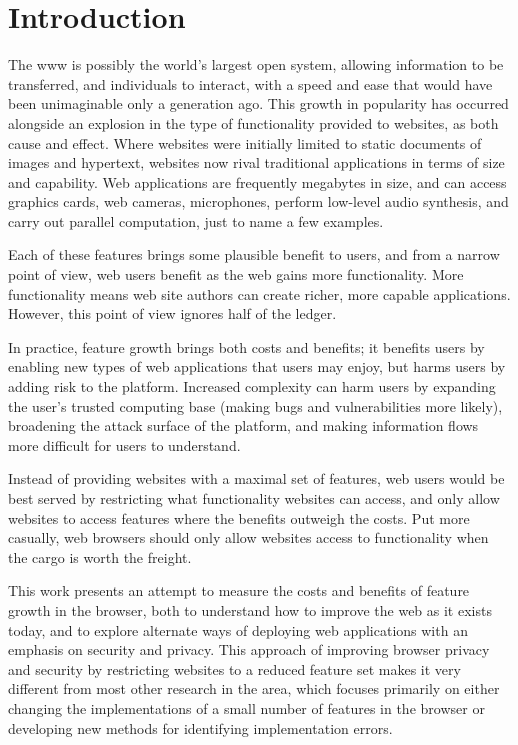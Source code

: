 \chapter{Introduction}
\label{intro}

The \gls{www} is possibly the world's largest open system, allowing information
to be transferred, and individuals to interact, with a speed and ease that would
have been unimaginable only a generation ago.  This growth in popularity
has occurred alongside an explosion in the type of functionality provided to
websites, as both cause and effect.  Where websites were initially limited
to static documents of images and hypertext, websites now rival traditional
applications in terms of size and capability.  Web applications are frequently
megabytes in size, and can access graphics cards, web cameras, microphones,
perform low-level audio synthesis, and carry out parallel computation, just to
name a few examples.

Each of these features brings some plausible benefit to users, and from a
narrow point of view, web users benefit as the web gains more functionality.
More functionality means web site authors can create richer, more capable
applications. However, this point of view ignores half of the ledger.

In practice, feature growth brings both costs and benefits; it benefits users
by enabling new types of web applications that users may enjoy, but
harms users by adding risk to the platform.  Increased complexity
can harm users by expanding the user's trusted computing base (making bugs and
vulnerabilities more likely), broadening the attack surface of the platform,
and making information flows more difficult for users to understand.

Instead of providing websites with a maximal set of features, web users would
be best served by restricting what functionality websites can access,
and only allow websites to access features where the benefits outweigh the
costs. Put more casually, web browsers should only allow websites access to
functionality when the cargo is worth the freight.

This work presents an attempt to measure the costs and benefits of feature
growth in the browser, both to understand how to improve the web as it exists
today, and to explore alternate ways of deploying web applications with
an emphasis on security and privacy.  This approach of improving browser
privacy and security by restricting websites to a reduced feature set
makes it very different from most other research in the area, which focuses
primarily on either changing the implementations of a small number of features
in the browser or developing new methods for identifying implementation errors.





